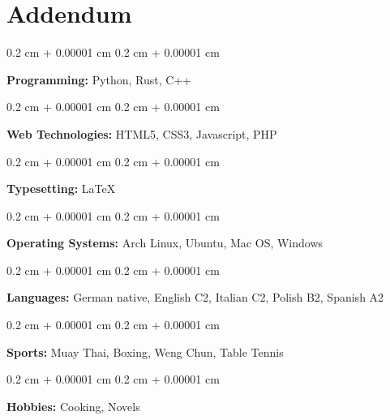 \documentclass[10pt, letterpaper]{article}
\newenvironment{onecolentry}{
    \begin{adjustwidth}{
        0.2 cm + 0.00001 cm
    }{
        0.2 cm + 0.00001 cm
    }
}{
    \end{adjustwidth}
}
\begin{document}
\section{Addendum}  
\begin{onecolentry}
	\textbf{Programming:} Python, Rust, C++
\end{onecolentry}
\vspace{0.2 cm}
\begin{onecolentry}
	\textbf{Web Technologies:} HTML5, CSS3, Javascript, PHP
\end{onecolentry}
\vspace{0.2 cm}
\begin{onecolentry}
	\textbf{Typesetting:} \LaTeX
\end{onecolentry}
\vspace{0.2 cm}
\begin{onecolentry}
	\textbf{Operating Systems:} Arch Linux, Ubuntu, Mac OS, Windows
\end{onecolentry}
\vspace{0.2 cm}
\begin{onecolentry}
	\textbf{Languages:} German native, English C2, Italian C2, Polish B2, Spanish A2
\end{onecolentry}
\vspace{0.2 cm}
\begin{onecolentry}
	\textbf{Sports:} Muay Thai, Boxing, Weng Chun, Table Tennis
\end{onecolentry}
\vspace{0.2 cm}
\begin{onecolentry}
	\textbf{Hobbies:} Cooking, Novels
\end{onecolentry}
\end{document}
